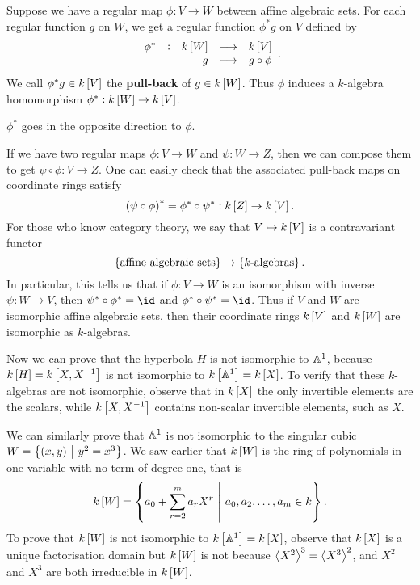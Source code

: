 Suppose we have a regular map $ \phi : V \to W $ between affine algebraic sets. For each regular function $ g $ on $ W $, we get a regular function $ \phi^*g $ on $ V $ defined by
$$ \function[\phi^*]{k\sbr{W}}{k\sbr{V}}{g}{g \circ \phi}. $$
We call $ \phi^*g \in k\sbr{V} $ the \textbf{pull-back} of $ g \in k\sbr{W} $. Thus $ \phi $ induces a $ k $-algebra homomorphism $ \phi^* : k\sbr{W} \to k\sbr{V} $.

\begin{note*}
$ \phi^* $ goes in the opposite direction to $ \phi $.
\end{note*}

If we have two regular maps $ \phi : V \to W $ and $ \psi : W \to Z $, then we can compose them to get $ \psi \circ \phi : V \to Z $. One can easily check that the associated pull-back maps on coordinate rings satisfy
$$ \br{\psi \circ \phi}^* = \phi^* \circ \psi^* : k\sbr{Z} \to k\sbr{V}. $$
For those who know category theory, we say that $ V \mapsto k\sbr{V} $ is a contravariant functor
$$ \cbr{\text{affine algebraic sets}} \to \cbr{\text{$ k $-algebras}}. $$
In particular, this tells us that if $ \phi : V \to W $ is an isomorphism with inverse $ \psi : W \to V $, then $ \psi^* \circ \phi^* = \id $ and $ \phi^* \circ \psi^* = \id $. Thus if $ V $ and $ W $ are isomorphic affine algebraic sets, then their coordinate rings $ k\sbr{V} $ and $ k\sbr{W} $ are isomorphic as $ k $-algebras.

\begin{example*}
Now we can prove that the hyperbola $ H $ is not isomorphic to $ \AA^1 $, because $ k\sbr{H} = k\sbr{X, X^{-1}} $ is not isomorphic to $ k\sbr{\AA^1} = k\sbr{X} $. To verify that these $ k $-algebras are not isomorphic, observe that in $ k\sbr{X} $ the only invertible elements are the scalars, while $ k\sbr{X, X^{-1}} $ contains non-scalar invertible elements, such as $ X $.
\end{example*}

\begin{example*}
We can similarly prove that $ \AA^1 $ is not isomorphic to the singular cubic $ W = \cbr{\br{x, y} \st y^2 = x^3} $. We saw earlier that $ k\sbr{W} $ is the ring of polynomials in one variable with no term of degree one, that is
$$ k\sbr{W} = \cbr{a_0 + \sum_{r = 2}^m a_rX^r \st a_0, a_2, \dots, a_m \in k}. $$
To prove that $ k\sbr{W} $ is not isomorphic to $ k\sbr{\AA^1} = k\sbr{X} $, observe that $ k\sbr{X} $ is a unique factorisation domain but $ k\sbr{W} $ is not because $ \abr{X^2}^3 = \abr{X^3}^2 $, and $ X^2 $ and $ X^3 $ are both irreducible in $ k\sbr{W} $.
\end{example*}


